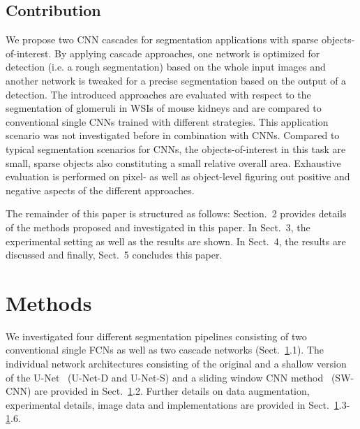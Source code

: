 \documentclass{elsarticle}
\begin{document}
\subsection{Contribution}
We propose two CNN cascades for segmentation applications with sparse objects-of-interest.
By applying cascade approaches, one network is optimized for detection (i.e. a rough segmentation) based on the whole input images and another network is tweaked for a precise segmentation based on the output of a detection.
%
The introduced approaches are evaluated with respect to the segmentation of glomeruli in WSIs of mouse kidneys and are compared to conventional single CNNs trained with different strategies.
This application scenario was not investigated before in combination with CNNs.
Compared to typical segmentation scenarios for CNNs, the objects-of-interest in this task are small, sparse objects also constituting a small relative overall area.
%
Exhaustive evaluation is performed on pixel- as well as object-level figuring out positive and negative aspects of the different approaches.

The remainder of this paper is structured as follows: Section.~2 provides details of the methods proposed and investigated in this paper.
In Sect.~3, the experimental setting as well as the results are shown. In Sect.~4, the results are discussed and finally, Sect.~5 concludes this paper.









\section{Methods} \label{sec:main}

We investigated four different segmentation pipelines consisting of two conventional single FCNs as well as two cascade networks (Sect.~\ref{sec:main}.1). The individual network architectures consisting of the original and a shallow version of the U-Net~\citep{myRonneberger15a} (U-Net-D and U-Net-S) and a sliding window CNN method~\citep{NIPS2012_4741} (SW-CNN) are provided in Sect.~\ref{sec:main}.2. Further details on data augmentation, experimental details, image data and implementations are provided in Sect.~\ref{sec:main}.3-\ref{sec:main}.6.

\end{document}
